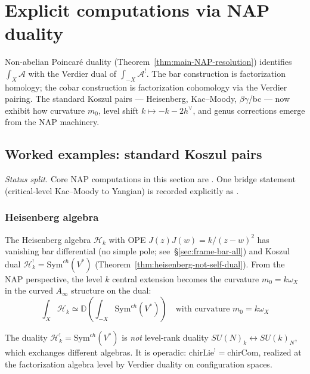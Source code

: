 \chapter{Explicit computations via NAP duality}
\label{chap:NAP-computations}


Non-abelian Poincar\'e duality (Theorem~\ref{thm:main-NAP-resolution}) identifies $\int_X \mathcal{A}$ with the Verdier dual of $\int_{-X} \mathcal{A}^!$.  The bar construction is factorization homology; the cobar construction is factorization cohomology via the Verdier pairing.  The standard Koszul pairs --- Heisenberg, Kac--Moody, $\beta\gamma$/bc --- now exhibit how curvature $m_0$, level shift $k \mapsto -k-2h^\vee$, and genus corrections emerge from the NAP machinery.

\section{Worked examples: standard Koszul pairs}
\noindent\emph{Status split.} Core NAP computations in this section are
\ClaimStatusProvedHere.  One bridge statement (critical-level
Kac--Moody to Yangian) is recorded
explicitly as \ClaimStatusConjectured.

\subsection{Heisenberg algebra}

\begin{example}\label{ex:heisenberg-NAP}
The Heisenberg algebra $\mathcal{H}_k$ with OPE $J(z)J(w) = k/(z-w)^2$ has vanishing bar differential (no simple pole; see~\S\ref{sec:frame-bar-all}) and Koszul dual $\mathcal{H}_k^! = \mathrm{Sym}^{ch}(V^*)$ (Theorem~\ref{thm:heisenberg-not-self-dual}).  From the NAP perspective, the level $k$ central extension becomes the curvature $m_0 = k\omega_X$ in the curved $A_\infty$ structure on the dual:
\[\int_X \mathcal{H}_k \simeq \mathbb{D}\left(\int_{-X} \mathrm{Sym}^{ch}(V^*)\right) \quad \text{with curvature } m_0 = k\omega_X\]
\end{example}

\begin{remark}\label{rem:heisenberg-koszul}
The duality $\mathcal{H}_k^! = \mathrm{Sym}^{ch}(V^*)$ is \emph{not} level-rank duality $SU(N)_k \leftrightarrow SU(k)_N$, which exchanges different algebras.  It is operadic: $\mathrm{chirLie}^! = \mathrm{chirCom}$, realized at the factorization algebra level by Verdier duality on configuration spaces.
\end{remark}

